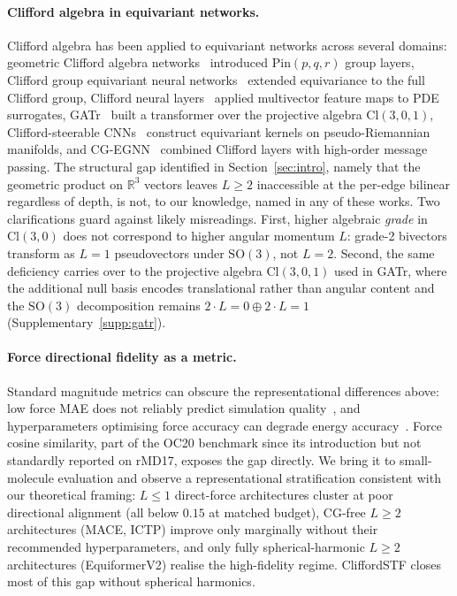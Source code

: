 \paragraph{Clifford algebra in equivariant networks.}
Clifford algebra has been applied to equivariant networks across several domains: geometric Clifford algebra networks~\citep{ruhe2023gcan} introduced $\mathrm{Pin}(p,q,r)$ group layers, Clifford group equivariant neural networks~\citep{ruhe2023cgenn} extended equivariance to the full Clifford group, Clifford neural layers~\citep{brandstetter2022clifford} applied multivector feature maps to PDE surrogates, GATr~\citep{brehmer2023geometric} built a transformer over the projective algebra $\mathrm{Cl}(3,0,1)$, Clifford-steerable CNNs~\citep{zhdanov2024clifford} construct equivariant kernels on pseudo-Riemannian manifolds, and CG-EGNN~\citep{tran2024cgegnn} combined Clifford layers with high-order message passing. The structural gap identified in Section~\ref{sec:intro}, namely that the geometric product on $\mathbb{R}^3$ vectors leaves $L \geq 2$ inaccessible at the per-edge bilinear regardless of depth, is not, to our knowledge, named in any of these works. Two clarifications guard against likely misreadings. First, higher algebraic \emph{grade} in $\mathrm{Cl}(3,0)$ does not correspond to higher angular momentum $L$: grade-2 bivectors transform as $L{=}1$ pseudovectors under $\mathrm{SO}(3)$, not $L{=}2$. Second, the same deficiency carries over to the projective algebra $\mathrm{Cl}(3,0,1)$ used in GATr, where the additional null basis encodes translational rather than angular content and the $\mathrm{SO}(3)$ decomposition remains $2 \cdot L{=}0 \oplus 2 \cdot L{=}1$ (Supplementary~\ref{supp:gatr}).

\paragraph{Force directional fidelity as a metric.}
Standard magnitude metrics can obscure the representational differences above: low force MAE does not reliably predict simulation quality~\citep{fu2023forces}, and hyperparameters optimising force accuracy can degrade energy accuracy~\citep{kovacs2023mace}. Force cosine similarity, part of the OC20 benchmark since its introduction but not standardly reported on rMD17, exposes the gap directly. We bring it to small-molecule evaluation and observe a representational stratification consistent with our theoretical framing: $L \leq 1$ direct-force architectures cluster at poor directional alignment (all below $0.15$ at matched budget), CG-free $L \geq 2$ architectures (MACE, ICTP) improve only marginally without their recommended hyperparameters, and only fully spherical-harmonic $L \geq 2$ architectures (EquiformerV2) realise the high-fidelity regime. CliffordSTF closes most of this gap without spherical harmonics.
